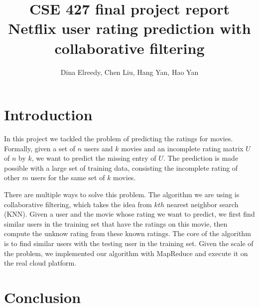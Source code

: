 \documentclass{article}
\title{CSE 427 final project report\\
  Netflix user rating prediction with collaborative filtering}
\author{Dina Elreedy, Chen Liu, Hang Yan, Hao Yan}
\begin{document}
\maketitle
  \section{Introduction}
  In this project we tackled the problem of predicting the ratings for
  movies. Formally, given a set of $n$ users and $k$ movies and an
  incomplete rating matrix $U$ of $n$ by $k$, we want to predict the
  missing entry of $U$. The prediction is made possible with a large
  set of training data, consisting the incomplete rating of other $m$
  users for the same set of $k$ movies.

  There are multiple ways to solve this problem. The algorithm we are
  using is collaborative filtering, which takes the idea from $kth$
  nearest neighbor search (KNN). Given a user and the movie whose
  rating we want to predict, we first find similar users in the
  training set that have the ratings on this movie, then compute the
  unknow rating from these known ratings. The core of the algorithm is
  to find similar users with the testing user in the training
  set. Given the scale of the problem, we implemented our algorithm
  with MapReduce and execute it on the real cloud platform.

  
  
  

  

  

  

  \section{Conclusion}
\end{document}

